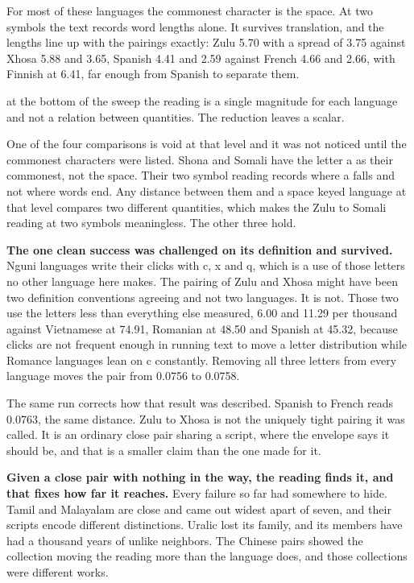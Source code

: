 For most of these languages the commonest character is the space. At two symbols the text records word lengths alone. It survives translation, and the lengths line up with the pairings exactly: Zulu 5.70 with a spread of 3.75 against Xhosa 5.88 and 3.65, Spanish 4.41 and 2.59 against French 4.66 and 2.66, with Finnish at 6.41, far enough from Spanish to separate them.

at the bottom of the sweep the reading is a single magnitude for each language and not a relation between quantities. The reduction leaves a scalar.

One of the four comparisons is void at that level and it was not noticed until the commonest characters were listed. Shona and Somali have the letter a as their commonest, not the space. Their two symbol reading records where a falls and not where words end. Any distance between them and a space keyed language at that level compares two different quantities, which makes the Zulu to Somali reading at two symbols meaningless. The other three hold.

\textbf{The one clean success was challenged on its definition and survived.} Nguni languages write their clicks with c, x and q, which is a use of those letters no other language here makes. The pairing of Zulu and Xhosa might have been two definition conventions agreeing and not two languages. It is not. Those two use the letters less than everything else measured, 6.00 and 11.29 per thousand against Vietnamese at 74.91, Romanian at 48.50 and Spanish at 45.32, because clicks are not frequent enough in running text to move a letter distribution while Romance languages lean on c constantly. Removing all three letters from every language moves the pair from 0.0756 to 0.0758.

The same run corrects how that result was described. Spanish to French reads 0.0763, the same distance. Zulu to Xhosa is not the uniquely tight pairing it was called. It is an ordinary close pair sharing a script, where the envelope says it should be, and that is a smaller claim than the one made for it.

\textbf{Given a close pair with nothing in the way, the reading finds it, and that fixes how far it reaches.} Every failure so far had somewhere to hide. Tamil and Malayalam are close and came out widest apart of seven, and their scripts encode different distinctions. Uralic lost its family, and its members have had a thousand years of unlike neighbors. The Chinese pairs showed the collection moving the reading more than the language does, and those collections were different works.

